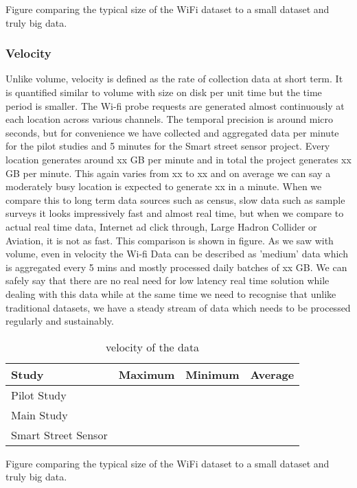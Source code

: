 Figure comparing the typical size of the WiFi dataset to a small dataset and truly big data.

\subsubsection{Velocity}

Unlike volume, velocity is defined as the rate of collection data at short term.
It is quantified similar to volume with size on disk per unit time but the time period is smaller.
The Wi-fi probe requests are generated almost continuously at each location across various channels.
The temporal precision is around micro seconds, but for convenience we have collected and aggregated data per minute for the pilot studies and 5 minutes for the Smart street sensor project.
Every location generates around xx GB per minute and in total the project generates xx GB per minute.
This again varies from xx to xx and on average we can say a moderately busy location is expected to generate xx in a minute.
When we compare this to long term data sources such as census, slow data such as sample surveys it looks impressively fast and almost real time, but when we compare to actual real time data, Internet ad click through, Large Hadron Collider or Aviation, it is not as fast.
This comparison is shown in figure.
As we saw with volume, even in velocity the Wi-fi Data can be described as 'medium' data which is aggregated every 5 mins and mostly processed daily batches of xx GB.
We can safely say that there are no real need for low latency real time solution while dealing with this data while at the same time we need to recognise that unlike traditional datasets, we have a steady stream of data which needs to be processed regularly and sustainably.

\begin{table}
    \centering
    \begin{tabular}{|l|c|c|c|}
        \hline
        Study & Maximum & Minimum & Average \\
        \hline
        Pilot Study & & & \\
        Main Study & & & \\
        Smart Street Sensor & & & \\
        \hline
    \end{tabular}
    \caption{velocity of the data}
    \label{velocity_table}
\end{table}

Figure comparing the typical size of the WiFi dataset to a small dataset and truly big data.

